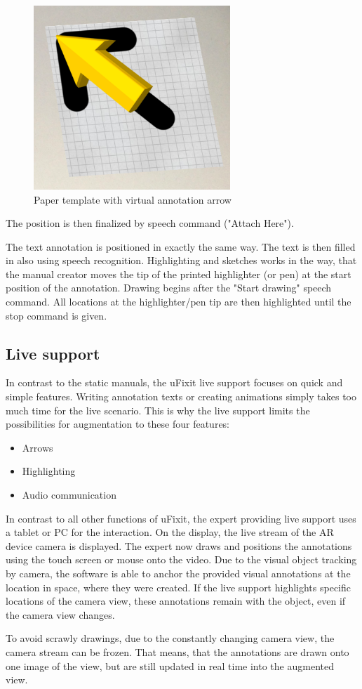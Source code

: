 \begin{figure}[H]
		\includegraphics[width=0.66\textwidth]{../images/paperArrowAugmented.png}
		\centering
		\caption{Paper template with virtual annotation arrow}
		\label{fig:cardBoard}
\end{figure}

The position is then finalized by speech command ("Attach Here").

The text annotation is positioned in exactly the same way. The text is then filled in also using speech recognition.
Highlighting and sketches works in the way, that the manual creator moves the tip of the printed highlighter (or pen) at the start position of the annotation. Drawing begins after the "Start drawing" speech command. All locations at the highlighter/pen tip are then highlighted until the stop command is given.


\subsection{Live support}
In contrast to the static manuals, the uFixit live support focuses on quick and simple features. Writing annotation texts or creating animations simply takes too much time for the live scenario. This is why the live support limits the possibilities for augmentation to these four features:
\begin{itemize}
\item Arrows
\item Highlighting
\item Audio communication
\end{itemize}

In contrast to all other functions of uFixit, the expert providing live support uses a tablet or PC for the interaction. On the display, the live stream of the AR device camera is displayed. The expert now draws and positions the annotations using the touch screen or mouse onto the video.
Due to the visual object tracking by camera, the software is able to anchor the provided visual annotations at the location in space, where they were created. If the live support highlights specific locations of the camera view, these annotations remain with the object, even if the camera view changes.

To avoid scrawly drawings, due to the constantly changing camera view, the camera stream can be frozen. That means, that the annotations are drawn onto one image of the view, but are still updated in real time into the augmented view.

